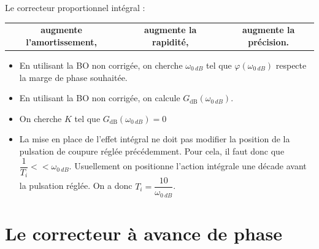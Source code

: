 \documentclass[10pt,fleqn]{article} %
\begin{document}
\begin{resultat}
Le correcteur proportionnel intégral : 
\begin{center}
\begin{tabular}{ccccc}
\textbf{augmente l'amortissement,} &&
\textbf{augmente la rapidité,} && 
\textbf{augmente la précision.} \\
\end{tabular}
\end{center}
\end{resultat}



\begin{methode}
\begin{itemize}
\item En utilisant la BO non corrigée, on cherche $\omega_{\SI{0}{dB}}$ tel que $\varphi(\omega_{\SI{0}{dB}})$ respecte la marge de phase souhaitée. 
\item En utilisant la BO non corrigée, on calcule $G_{\text{dB}}\left(\omega_{\SI{0}{dB}}\right)$. 
\item On cherche $K$ tel que $G_{\text{dB}}\left(\omega_{\SI{0}{dB}}\right)=0$
\item La mise en place de l'effet intégral ne doit pas modifier la position de la pulsation de coupure réglée précédemment. Pour cela, il faut donc que $\dfrac{1}{T_i}<< \omega_{\SI{0}{dB}}$. Usuellement on positionne l'action intégrale une décade avant la pulsation réglée. On a donc $T_i=\dfrac{10}{\omega_{\SI{0}{dB}}}$.
\end{itemize}

\end{methode}
\newpage

\section{Le correcteur à avance de phase}
\end{document}
